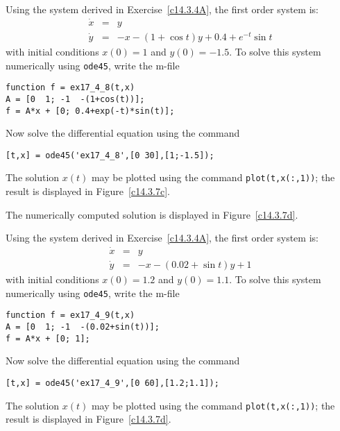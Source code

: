\soln  Using the system  derived in 
Exercise~\ref{c14.3.4A}, the first order system is:
\begin{eqnarray*}
\dot{x} & = & y \\
\dot{y} & = & -x - (1+\cos t)y + 0.4 + e^{-t}\sin t
\end{eqnarray*}
with initial conditions $x(0)=1$ and $y(0)=-1.5$. To solve this system numerically 
using {\tt ode45}, write the m-file
\begin{verbatim}
function f = ex17_4_8(t,x)
A = [0  1; -1  -(1+cos(t))];
f = A*x + [0; 0.4+exp(-t)*sin(t)];
\end{verbatim}
Now solve the differential equation using the command
\begin{verbatim}
[t,x] = ode45('ex17_4_8',[0 30],[1;-1.5]);
\end{verbatim}
The solution $x(t)$ may be plotted using the command {\tt plot(t,x(:,1))}; the 
result is displayed in Figure~\ref{c14.3.7c}.
\begin{figure}[htb]
     \centerline{%
     }
\end{figure} 



 \ans The numerically computed solution is displayed in 
Figure~\ref{c14.3.7d}.

\soln  Using the system  derived in 
Exercise~\ref{c14.3.4A}, the first order system is:
\begin{eqnarray*}
\dot{x} & = & y \\
\dot{y} & = & -x - (0.02+\sin t)y + 1
\end{eqnarray*}
with initial conditions $x(0)=1.2$ and $y(0)=1.1$.   To solve this system numerically 
using {\tt ode45}, write the m-file
\begin{verbatim}
function f = ex17_4_9(t,x)
A = [0  1; -1  -(0.02+sin(t))];
f = A*x + [0; 1];
\end{verbatim}
Now solve the differential equation using the command
\begin{verbatim}
[t,x] = ode45('ex17_4_9',[0 60],[1.2;1.1]);
\end{verbatim}
The solution $x(t)$ may be plotted using the command {\tt plot(t,x(:,1))}; the 
result is displayed in Figure~\ref{c14.3.7d}.
\begin{figure}[htb]
     \centerline{%
     }
\end{figure} 



